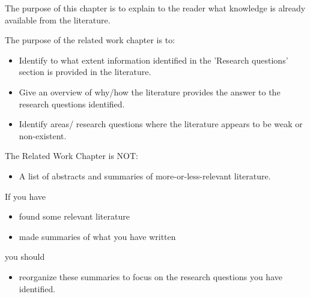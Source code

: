 \documentclass[informationsecurity]{gucmasterproject}
\begin{document}




\newpage

The purpose of this chapter
is to explain to the reader what knowledge is already
available from the literature.

The purpose of the related work chapter is to:
\begin{itemize}
\item Identify to what extent information identified in the 'Research questions'  section is provided in the literature.
\item Give an overview of why/how the literature provides the answer to the research questions identified.
\item Identify areas/ research questions where the literature appears to be weak or non-existent.
\end{itemize}
The Related Work Chapter is NOT:
\begin{itemize}
\item   A list of abstracts and summaries of more-or-less-relevant literature.
\end{itemize}
If you have
\begin{itemize}
\item   found some relevant literature
\item   made summaries of what you have written
\end{itemize}
you should
\begin{itemize}
\item reorganize these summaries to focus on the research questions you have identified.
\end{itemize}
\end{document}
